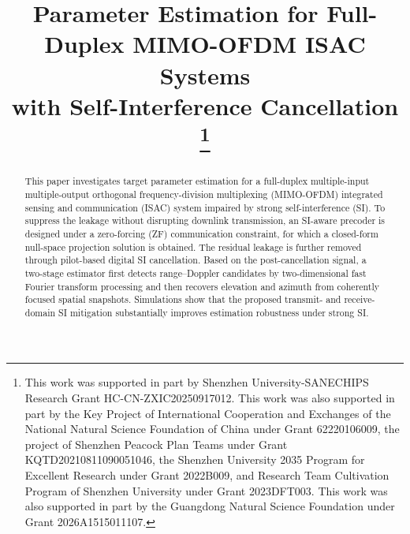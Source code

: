 \documentclass[conference]{IEEEtran}
\begin{document}
\title{Parameter Estimation for Full-Duplex MIMO-OFDM ISAC Systems \\ with Self-Interference Cancellation%
\thanks{This work was supported in part by Shenzhen University-SANECHIPS Research Grant HC-CN-ZXIC20250917012. This work was also supported in part by the Key Project of International Cooperation and Exchanges of the National Natural Science Foundation of China under Grant 62220106009, the project of Shenzhen Peacock Plan Teams under Grant KQTD20210811090051046, the Shenzhen University 2035 Program for Excellent Research under Grant 2022B009, and Research Team Cultivation Program of Shenzhen University under Grant 2023DFT003. This work was also supported in part by the Guangdong Natural Science Foundation under Grant 2026A1515011107.}}

\author{
}

\maketitle

\begin{abstract}
This paper investigates target parameter estimation for a full-duplex multiple-input multiple-output orthogonal frequency-division multiplexing (MIMO-OFDM) integrated sensing and communication (ISAC) system impaired by strong self-interference (SI). To suppress the leakage without disrupting downlink transmission, an SI-aware precoder is designed under a zero-forcing (ZF) communication constraint, for which a closed-form null-space projection solution is obtained. The residual leakage is further removed through pilot-based digital SI cancellation. Based on the post-cancellation signal, a two-stage estimator first detects range--Doppler candidates by two-dimensional fast Fourier transform processing and then recovers elevation and azimuth from coherently focused spatial snapshots. Simulations show that the proposed transmit- and receive-domain SI mitigation substantially improves estimation robustness under strong SI.
\end{abstract}
\end{document}
